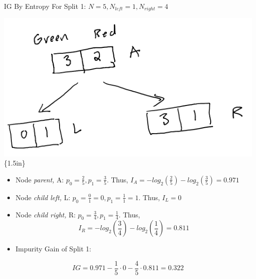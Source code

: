 \documentclass[
  ignorenonframetext,
]{beamer}
\begin{document}
\begin{frame}{IG By Entropy}
\label{ig-by-entropy}
For Split 1: \(N = 5, N_{left} =1, N_{right} = 4\)

\includegraphics{images/im1.png}\{1.5in\}

\begin{itemize}
\item
  Node \emph{parent,} A: \(p_0 = \frac{2}{5}, p_1 = \frac{3}{5}\). Thus,
  \(I_{A} = - log_2(\frac{2}{5})-log_2(\frac{3}{5}) = 0.971\)
\item
  Node \emph{child left,} L:
  \(p_0 = \frac{0}{1} = 0, p_1 = \frac{1}{1} = 1\). Thus, \(I_{L} = 0\)
\item
  Node \emph{child right,} R: \(p_0 = \frac{3}{4}, p_1 = \frac{1}{4}\).
  Thus, \[I_{R} = -log_2(\frac{3}{4})-log_2(\frac{1}{4}) = 0.811\]
\item
  Impurity Gain of Split 1:
\end{itemize}

\[IG = 0.971 - \frac{1}{5} \cdot 0-\frac{4}{5} \cdot 0.811 = 0.322\]
\end{frame}
\end{document}
